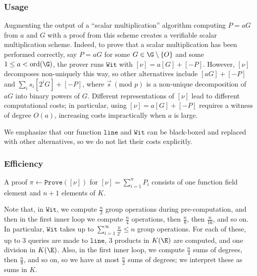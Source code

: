 \documentclass[11pt,letterpaper]{article}
\newcommand{\brando}[1]{{\textcolor{green}{#1}}}
\theoremstyle{definition}
\newcommand{\6}{\mathbf}
\newcommand{\7}{\mathcal}
\begin{document}
\subsubsection{Usage}
Augmenting the output of a ``scalar multiplication'' algorithm computing $P=aG$ from $a$ and $G$ with a proof from this scheme creates a verifiable scalar multiplication scheme. Indeed, to prove that a scalar multiplication has been performed correctly, say $P = aG$ for some $G \in \G \setminus\left\{O\right\}$ and some $1 \leq a < \text{ord}(\G)$, the prover runs $\texttt{Wit}$ with $[\nu] = a[G] + [-P]$. However, $[\nu]$ decomposes non-uniquely this way, so other alternatives include $[aG] + [-P]$ and $\sum_i s_i [2^i G] + [-P]$, where $\vec{s} \ (\text{mod }p)$ is a non-unique decomposition of $aG$ into binary powers of $G$. Different representations of $[\nu]$ lead to different computational costs; in particular, using $[\nu] = a[G] + [-P]$ requires a witness of degree $O(a)$, increasing costs impractically when $a$ is large.

We emphasize that our function $\texttt{line}$ and $\texttt{Wit}$ can be black-boxed and replaced with other alternatives, so we do not list their costs explicitly.

\subsubsection{Efficiency}\label{sec:efficiency}

A proof $\pi \leftarrow \texttt{Prove}([\nu])$ for $[\nu] = \sum_{i=1}^{n} P_i$ consists of one function field element and $n+1$  elements of $K$. 


Note that, in $\texttt{Wit}$, we compute $\frac{n}{2}$ group operations during pre-computation, and then in the first inner loop we compute $\frac{n}{4}$ operations, then $\frac{n}{8}$, then $\frac{n}{16}$, and so on. In particular, $\texttt{Wit}$ takes up to $\sum\limits_{i=1}^\infty \frac{n}{2^i} \leq n$ group operations. For each of these, up to $3$ queries are made to $\texttt{line}$, $3$ products in $K(\E)$ are computed, and one division in $K(\E)$. Also, in the first inner loop, we compute $\frac{n}{4}$ sums of degrees, then $\frac{n}{8}$, and so on, so we have at most $\frac{n}{2}$ sums of degrees; we interpret these as sums in $K$. 


\end{document}
